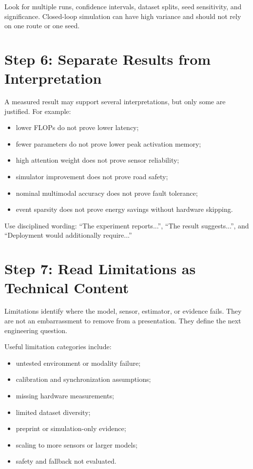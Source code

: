 Look for multiple runs, confidence intervals, dataset splits, seed sensitivity, and significance. Closed-loop simulation can have high variance and should not rely on one route or one seed.

\section{Step 6: Separate Results from Interpretation}

A measured result may support several interpretations, but only some are justified. For example:

\begin{itemize}
    \item lower FLOPs do not prove lower latency;
    \item fewer parameters do not prove lower peak activation memory;
    \item high attention weight does not prove sensor reliability;
    \item simulator improvement does not prove road safety;
    \item nominal multimodal accuracy does not prove fault tolerance;
    \item event sparsity does not prove energy savings without hardware skipping.
\end{itemize}

Use disciplined wording: ``The experiment reports...'', ``The result suggests...'', and ``Deployment would additionally require...''

\section{Step 7: Read Limitations as Technical Content}

Limitations identify where the model, sensor, estimator, or evidence fails. They are not an embarrassment to remove from a presentation. They define the next engineering question.

Useful limitation categories include:

\begin{itemize}
    \item untested environment or modality failure;
    \item calibration and synchronization assumptions;
    \item missing hardware measurements;
    \item limited dataset diversity;
    \item preprint or simulation-only evidence;
    \item scaling to more sensors or larger models;
    \item safety and fallback not evaluated.
\end{itemize}

